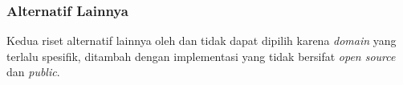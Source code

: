 



\subsubsection{Alternatif Lainnya}

Kedua riset alternatif lainnya oleh \cite{baqa2019semantic} dan \cite{cano2021toward} tidak dapat dipilih karena \textit{domain} yang terlalu spesifik, ditambah dengan implementasi yang tidak bersifat \textit{open source} dan \textit{public}.




